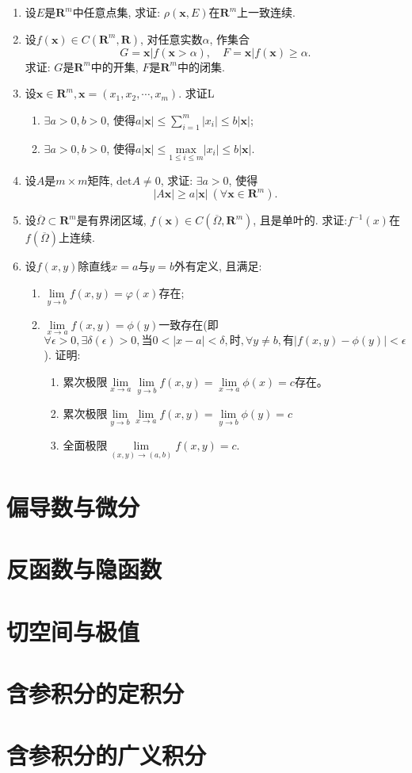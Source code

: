 \begin{enumerate}
\item 设$E$是$\bm{R}^m$中任意点集, 求证: $\rho(\bm{x},E)$在$\bm{R}^m$上一致连续.
\item 设$f(\bm{x})\in C(\bm{R}^m,\bm{R})$, 对任意实数$\alpha$, 作集合
$$ G={\bm{x}|f(\bm{x}>\alpha)},\quad F={\bm{x}|f(\bm{x})\ge\alpha}.$$
求证: $G$是$\bm{R}^m$中的开集, $F$是$\bm{R}^m$中的闭集.
\item 设$\bm{x}\in \bm{R}^m, \bm{x}=(x_1,x_2,\cdots,x_m)$. 求证L
\begin{enumerate}
	\item $\exists a>0, b>0$, 使得$a|\bm{x}|\le \sum\limits_{i=1}^{m}|x_i|\le b|\bm{x}|$;
		\item $\exists a>0, b>0$, 使得$a|\bm{x}|\le \underset{1\le i \le m}{\mathrm{max}}|x_i|\le b|\bm{x}|$.
\end{enumerate}
\item 设$A$是$m\times m$矩阵, $\mathrm{det}A\ne 0$, 求证: $\exists a>0$, 使得
$$ |A\bm{x}|\ge a|\bm{x}|\ (\forall \bm{x}\in \bm{R}^m).$$
\item 设$\overline{\Omega}\subset\bm{R}^m$是有界闭区域, $f(\bm{x})\in C(\overline{\Omega},\bm{R}^m)$, 且是单叶的. 求证:$f^{-1}(x)$在$f(\overline{\Omega})$上连续.
\item 设$f(x,y)$除直线$x=a$与$y=b$外有定义, 且满足:
\begin{enumerate}
	\item $\lim\limits_{y\rightarrow b}f(x,y)=\varphi (x)$存在;
	\item $\lim\limits_{x\rightarrow a}f(x,y)=\phi (y)$一致存在(即$\forall \epsilon >0,\exists \delta (\epsilon)>0,\text{当}0<|x-a|<\delta, \text{时}, \forall y\ne b,\text{有}|f(x,y)-\phi(y)|<\epsilon$).
	证明:
	\begin{enumerate}
		\item 累次极限$\lim\limits_{x\rightarrow a}\lim\limits_{y\rightarrow b}f(x,y)=\lim\limits_{x\rightarrow a}\phi(x)=c$存在。
		\item 累次极限$\lim\limits_{y\rightarrow b}\lim\limits_{x\rightarrow a}f(x,y)=\lim\limits_{y\rightarrow b}\phi(y)=c$
		\item 全面极限$\lim\limits_{(x,y)\rightarrow (a,b)}f(x,y)=c$.
	\end{enumerate}
	
\end{enumerate}
\end{enumerate}

\section{偏导数与微分}

\section{反函数与隐函数}

\section{切空间与极值}

\section{含参积分的定积分}

\section{含参积分的广义积分}